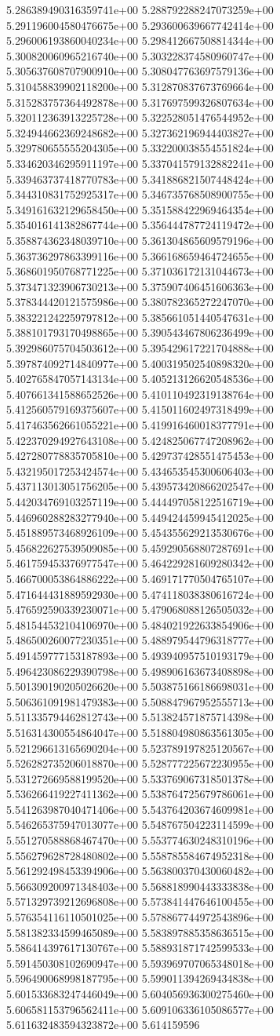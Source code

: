 5.286389490316359741e+00	5.288792288247073259e+00	5.291196004580476675e+00	5.293600639667742414e+00	5.296006193860040234e+00	5.298412667508814344e+00	5.300820060965216740e+00	5.303228374580960747e+00	5.305637608707900910e+00	5.308047763697579136e+00	5.310458839902118200e+00	5.312870837673769664e+00	5.315283757364492878e+00	5.317697599326807634e+00	5.320112363913225728e+00	5.322528051476544952e+00	5.324944662369248682e+00	5.327362196944403827e+00	5.329780655555204305e+00	5.332200038554551824e+00	5.334620346295911197e+00	5.337041579132882241e+00	5.339463737418770783e+00	5.341886821507448424e+00	5.344310831752925317e+00	5.346735768508900755e+00	5.349161632129658450e+00	5.351588422969464354e+00	5.354016141382867744e+00	5.356444787724119472e+00	5.358874362348039710e+00	5.361304865609579196e+00	5.363736297863399116e+00	5.366168659464724655e+00	5.368601950768771225e+00	5.371036172131044673e+00	5.373471323906730213e+00	5.375907406451606363e+00	5.378344420121575986e+00	5.380782365272247070e+00	5.383221242259797812e+00	5.385661051440547631e+00	5.388101793170498865e+00	5.390543467806236499e+00	5.392986075704503612e+00	5.395429617221704888e+00	5.397874092714840977e+00	5.400319502540898320e+00	5.402765847057143134e+00	5.405213126620548536e+00	5.407661341588652526e+00	5.410110492319138764e+00	5.412560579169375607e+00	5.415011602497318499e+00	5.417463562661055221e+00	5.419916460018377791e+00	5.422370294927643108e+00	5.424825067747208962e+00	5.427280778835705810e+00	5.429737428551475453e+00	5.432195017253424574e+00	5.434653545300606403e+00	5.437113013051756205e+00	5.439573420866202547e+00	5.442034769103257119e+00	5.444497058122516719e+00	5.446960288283277940e+00	5.449424459945412025e+00	5.451889573468926109e+00	5.454355629213530676e+00	5.456822627539509085e+00	5.459290568807287691e+00	5.461759453376977547e+00	5.464229281609280342e+00	5.466700053864886222e+00	5.469171770504765107e+00	5.471644431889592930e+00	5.474118038380616724e+00	5.476592590339230071e+00	5.479068088126505032e+00	5.481544532104106970e+00	5.484021922633854906e+00	5.486500260077230351e+00	5.488979544796318777e+00	5.491459777153187893e+00	5.493940957510193179e+00	5.496423086229390798e+00	5.498906163673408898e+00	5.501390190205026620e+00	5.503875166186698031e+00	5.506361091981479383e+00	5.508847967952555713e+00	5.511335794462812743e+00	5.513824571875714398e+00	5.516314300554864047e+00	5.518804980863561305e+00	5.521296613165690204e+00	5.523789197825120567e+00	5.526282735206018870e+00	5.528777225672230955e+00	5.531272669588199520e+00	5.533769067318501378e+00	5.536266419227411362e+00	5.538764725679786061e+00	5.541263987040471406e+00	5.543764203674609981e+00	5.546265375947013077e+00	5.548767504223114599e+00	5.551270588868467470e+00	5.553774630248310196e+00	5.556279628728480802e+00	5.558785584674952318e+00	5.561292498453394906e+00	5.563800370430060482e+00	5.566309200971348403e+00	5.568818990443333838e+00	5.571329739212696808e+00	5.573841447646100455e+00	5.576354116110501025e+00	5.578867744972543896e+00	5.581382334599465089e+00	5.583897885358636515e+00	5.586414397617130767e+00	5.588931871742599533e+00	5.591450308102690947e+00	5.593969707065348018e+00	5.596490068998187795e+00	5.599011394269434838e+00	5.601533683247446049e+00	5.604056936300275460e+00	5.606581153796562411e+00	5.609106336105086577e+00	5.611632483594323872e+00	5.614159596